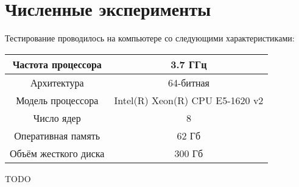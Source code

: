 \section*{Численные эксперименты}

Тестирование проводилось на компьютере со следующими характеристиками:

\begin{tabular}{| c | c |}
    \hline
    Частота процессора & 3.7 ГГц \\ \hline
    Архитектура & 64-битная \\ \hline
    Модель процессора & Intel(R) Xeon(R) CPU E5-1620 v2 \\ \hline
    Число ядер & 8 \\ \hline
    Оперативная память & 62 Гб \\ \hline
    Объём жесткого диска & 300 Гб \\
    \hline
\end{tabular}

TODO

